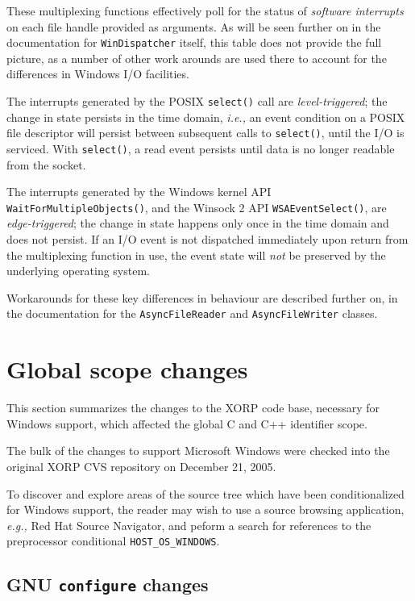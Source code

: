 \documentclass[11pt]{article}
\newcommand{\ie}{\emph{i.e.,}\xspace}
\newcommand{\eg}{\emph{e.g.,}\xspace}
\begin{document}
These multiplexing functions effectively poll for the
status of {\em software interrupts} on each file handle
provided as arguments.
As will be seen further on in the documentation for
{\tt WinDispatcher}
itself,
this table does not provide the full picture, as a number of other
work arounds are used there to account for the
differences in Windows I/O facilities.

The interrupts generated
by the POSIX {\tt select()} call are {\it level-triggered}; the change
in state persists in the time domain, \ie an event
condition on a POSIX file descriptor will persist between subsequent
calls to {\tt select()}, until the I/O is serviced.
With {\tt select()}, a read event persists until data is no longer
readable from the socket.

The interrupts generated by the Windows kernel API {\tt WaitForMultipleObjects()},
and the Winsock 2 API {\tt WSAEventSelect()}, are {\it edge-triggered}; the
change in state happens only once in the time domain and does not persist.
If an I/O event is not dispatched immediately upon return from the
multiplexing function in use, the event state will {\em not} be preserved
by the underlying operating system.

Workarounds for these key differences in behaviour are described
further on, in the documentation for the {\tt AsyncFileReader} and
{\tt AsyncFileWriter} classes.

\section{Global scope changes}

This section summarizes the changes to the XORP code base,
necessary for Windows support, which affected the global C and C++
identifier scope.

The bulk of the changes to support Microsoft Windows were checked into the
original XORP CVS repository on December 21, 2005.

To discover and explore
areas of the source tree which have been conditionalized for Windows support,
the reader may wish to use a source browsing application,
{\eg Red Hat Source Navigator}, and peform a search for references to
the preprocessor conditional
{\tt HOST\_OS\_WINDOWS}.

\subsection{GNU {\tt configure} changes}
\end{document}
